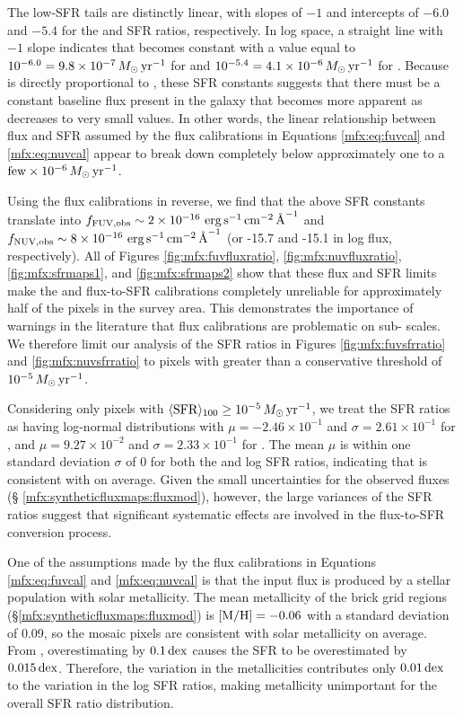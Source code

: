 The low-SFR tails are distinctly linear, with slopes of $-1$ and intercepts of
$-6.0$ and $-5.4$ for the \fuv{} and \nuv{} SFR ratios, respectively. In log
space, a straight line with $-1$ slope indicates that \sfrx{} becomes constant
with a value equal to $10^{-6.0} = 9.8\times 10^{-7}\,M_\odot\,\mathrm{yr}^{-1}$ for \fuv{}
and $10^{-5.4} = 4.1\times 10^{-6}\,M_\odot\,\mathrm{yr}^{-1}$ for \nuv{}. Because \sfrx{} is
directly proportional to \fxobs{}, these SFR constants suggests that there must
be a constant baseline flux present in the galaxy that becomes more apparent as
\sfroneh{} decreases to very small values. In other words, the linear
relationship between flux and SFR assumed by the flux calibrations in Equations
\ref{mfx:eq:fuvcal} and \ref{mfx:eq:nuvcal} appear to break down completely
below \sfroneh{} approximately one to a $\mathrm{few} \times
10^{-6}\,M_\odot\,\mathrm{yr}^{-1}$.

Using the flux calibrations in reverse, we find that the above SFR constants
translate into $f_{\mathrm{FUV},\mathrm{obs}} \sim 2\times 10^{-16}\, \,\mathrm{erg}\,\mathrm{s}^{-1}\,\mathrm{cm}^{-2}\,\textrm{\AA}^{-1}$ and $f_{\mathrm{NUV},\mathrm{obs}} \sim
8\times 10^{-16}\, \,\mathrm{erg}\,\mathrm{s}^{-1}\,\mathrm{cm}^{-2}\,\textrm{\AA}^{-1}$ (or -15.7 and -15.1 in log flux, respectively). All
of Figures \ref{fig:mfx:fuvfluxratio}, \ref{fig:mfx:nuvfluxratio},
\ref{fig:mfx:sfrmaps1}, and \ref{fig:mfx:sfrmaps2} show that these flux and SFR
limits make the \fuv{} and \nuv{} flux-to-SFR calibrations completely
unreliable for approximately half of the pixels in the survey area. This
demonstrates the importance of warnings in the literature
\citep[e.g.,][]{Murphy:2011,Kennicutt:2012,Leroy:2012} that flux calibrations
are problematic on sub-\kpc{} scales. We therefore limit our analysis of the SFR
ratios in Figures \ref{fig:mfx:fuvsfrratio} and \ref{fig:mfx:nuvsfrratio} to
pixels with \sfroneh{} greater than a conservative threshold of
$10^{-5}\,M_\odot\,\mathrm{yr}^{-1}$.

Considering only pixels with $\langle\mathrm{SFR}\rangle_{100} \ge 10^{-5}\,M_\odot\,\mathrm{yr}^{-1}$, we treat the
SFR ratios as having log-normal distributions with $\mu = -2.46\times 10^{-1}$
and $\sigma = 2.61\times 10^{-1}$ for \fuv{}, and $\mu = 9.27\times 10^{-2}$
and $\sigma = 2.33\times 10^{-1}$ for \nuv{}. The mean $\mu$ is within one
standard deviation $\sigma$ of 0 for both the \fuv{} and \nuv{} log SFR ratios,
indicating that \sfrx{} is consistent with \sfroneh{} on average. Given the
small uncertainties for the observed fluxes (\S
\ref{mfx:syntheticfluxmaps:fluxmod}), however, the large variances of the SFR
ratios suggest that significant systematic effects are involved in the
flux-to-SFR conversion process.

One of the assumptions made by the flux calibrations in Equations
\ref{mfx:eq:fuvcal} and \ref{mfx:eq:nuvcal} is that the input flux is produced
by a stellar population with solar metallicity. The mean metallicity of the
brick grid regions (\S \ref{mfx:syntheticfluxmaps:fluxmod}) is $\mathrm{[M/H]} = -0.06$
with a standard deviation of 0.09, so the mosaic pixels are consistent with
solar metallicity on average. From \citet{Simones:2014}, overestimating \met{}
by $0.1\,\mathrm{dex}$ causes the SFR to be overestimated by $0.015\,\mathrm{dex}$. Therefore, the
variation in the metallicities contributes only $0.01\,\mathrm{dex}$ to the variation in
the log SFR ratios, making metallicity unimportant for the overall SFR ratio
distribution.

